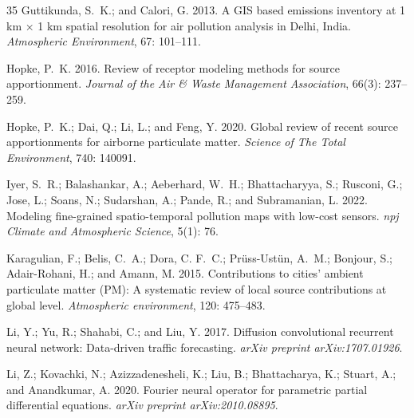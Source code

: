 \documentclass[letterpaper]{article} %
\theoremstyle{plain}
\theoremstyle{definition}
\theoremstyle{remark}
\begin{document}
\begin{thebibliography}{35}
Guttikunda, S.~K.; and Calori, G. 2013.
\newblock A GIS based emissions inventory at 1 km × 1 km spatial
  resolution for air pollution analysis in Delhi, India.
\newblock \emph{Atmospheric Environment}, 67: 101--111.

Hopke, P.~K. 2016.
\newblock Review of receptor modeling methods for source apportionment.
\newblock \emph{Journal of the Air \& Waste Management Association}, 66(3):
  237--259.

Hopke, P.~K.; Dai, Q.; Li, L.; and Feng, Y. 2020.
\newblock Global review of recent source apportionments for airborne
  particulate matter.
\newblock \emph{Science of The Total Environment}, 740: 140091.

Iyer, S.~R.; Balashankar, A.; Aeberhard, W.~H.; Bhattacharyya, S.; Rusconi, G.;
  Jose, L.; Soans, N.; Sudarshan, A.; Pande, R.; and Subramanian, L. 2022.
\newblock Modeling fine-grained spatio-temporal pollution maps with low-cost
  sensors.
\newblock \emph{npj Climate and Atmospheric Science}, 5(1): 76.

Karagulian, F.; Belis, C.~A.; Dora, C. F.~C.; Pr{\"u}ss-Ust{\"u}n, A.~M.;
  Bonjour, S.; Adair-Rohani, H.; and Amann, M. 2015.
\newblock Contributions to cities' ambient particulate matter (PM): A
  systematic review of local source contributions at global level.
\newblock \emph{Atmospheric environment}, 120: 475--483.

Li, Y.; Yu, R.; Shahabi, C.; and Liu, Y. 2017.
\newblock Diffusion convolutional recurrent neural network: Data-driven traffic
  forecasting.
\newblock \emph{arXiv preprint arXiv:1707.01926}.

Li, Z.; Kovachki, N.; Azizzadenesheli, K.; Liu, B.; Bhattacharya, K.; Stuart,
  A.; and Anandkumar, A. 2020.
\newblock Fourier neural operator for parametric partial differential
  equations.
\newblock \emph{arXiv preprint arXiv:2010.08895}.


\end{thebibliography}
\end{document}

